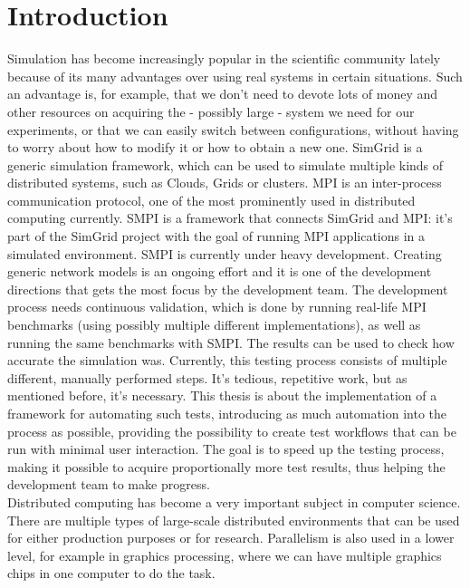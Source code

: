 
\chapter{Introduction}
\label{Chapter1}
Simulation has become increasingly popular in the scientific community
lately because of its many advantages over using real systems in
certain situations. Such an advantage is, for example, that we don't
need to devote lots of money and other resources on acquiring the -
possibly large - system we need for our experiments, or that we can
easily switch between configurations, without having to worry about
how to modify it or how to obtain a new one. SimGrid is a
generic simulation framework, which can be used to simulate multiple
kinds of distributed systems, such as Clouds, Grids or clusters. MPI
is an inter-process communication protocol, one of the most
prominently used in distributed computing currently. SMPI is a
framework that connects SimGrid and MPI: it's part of the SimGrid
project with the goal of running MPI applications in a simulated
environment. SMPI is currently under heavy development. Creating
generic network models is an ongoing effort and it is one of the
development directions that gets the most focus by the development
team. The development process needs continuous validation, which is
done by running real-life MPI benchmarks (using possibly multiple
different implementations), as well as running the same benchmarks
with SMPI. The results can be used to check how accurate the
simulation was. Currently, this testing process consists of multiple
different, manually performed steps. It's tedious, repetitive work,
but as mentioned before, it's necessary. This thesis is about the
implementation of a framework for automating such tests, introducing
as much automation into the process as possible, providing the
possibility to create test workflows that can be run with minimal user
interaction. The goal is to speed up the testing process, making it
possible to acquire proportionally more test results, thus helping the
development team to make progress.
\\
Distributed computing has become a very important subject in computer
science. There are multiple types of large-scale distributed
environments that can be used for either production purposes or for
research. Parallelism is also used in a lower level, for example in
graphics processing, where we can have multiple graphics chips in one
computer to do the task.\\
